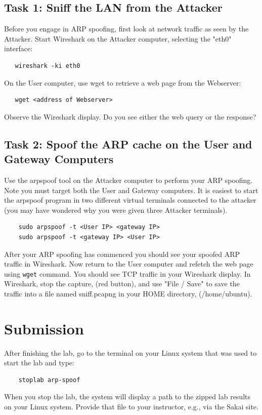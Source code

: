 \subsection{Task 1: Sniff the LAN from the Attacker}
Before you engage in ARP spoofing, first look at network traffic as seen by
the Attacker.
Start Wireshark on the Attacker computer, selecting the "eth0" interface:
\begin{verbatim}
   wireshark -ki eth0
\end{verbatim}

On the User computer, use wget to retrieve a web page from the Webserver:
\begin{verbatim}
   wget <address of Webserver>
\end{verbatim}

\noindent Observe the Wireshark display.  Do you see either the web query or the response?

\subsection{Task 2: Spoof the ARP cache on the User and Gateway Computers}
Use the arpspoof tool on the Attacker computer to perform your ARP spoofing.
Note you must target both the User and Gateway computers.  It is easiest to
start the arpspoof program in two different virtual terminals connected to the 
attacker (you may have wondered why you were given three Attacker terminals).

\begin{verbatim}
    sudo arpspoof -t <User IP> <gateway IP>
    sudo arpspoof -t <gateway IP> <User IP>
\end{verbatim}


After your ARP spoofing has commenced you should see your spoofed ARP traffic in Wireshark.
Now return to the User computer and refetch
the web page using {\tt wget} command.  You should see TCP traffic in your Wireshark
display.  In Wireshark, stop the capture, (red button), and use 
"File / Save" to save the traffic into a file named sniff.pcapng in your HOME directory,
(/home/ubuntu).

\section{Submission}
After finishing the lab, go to the terminal on your Linux system that was used to start the lab and type:
\begin{verbatim}
    stoplab arp-spoof
\end{verbatim}
When you stop the lab, the system will display a path to the zipped lab results on your Linux system.  Provide that file to 
your instructor, e.g., via the Sakai site.


